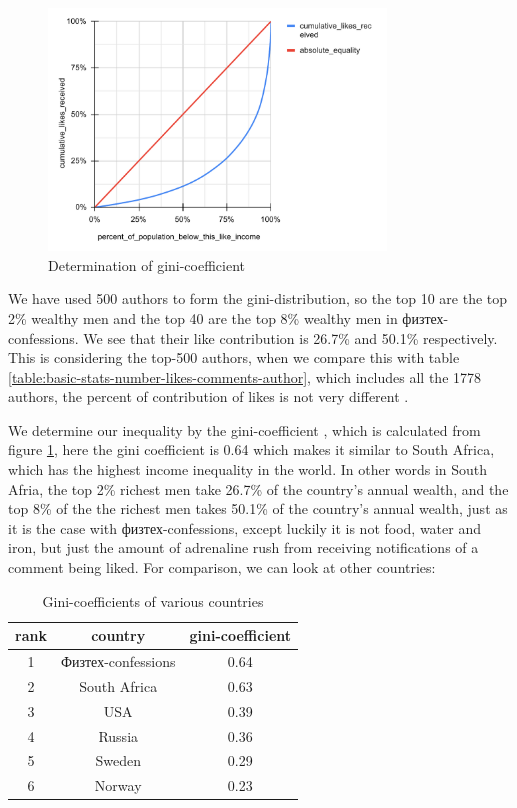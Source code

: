 \documentclass[
	12pt
] {article}
\begin{document}
	\begin{figure}[H]
		\centering
		\includegraphics[width=0.8\textwidth]{fig-gini-calculation}
		\caption{Determination of gini-coefficient \cite{wikipedia-gini}}
		\label{fig-gini-calculation}
	\end{figure}

	We have used 500 authors to form the gini-distribution, so the top 10 are the top \num{2}\% wealthy men and the top 40 are the top \num{8}\% wealthy men in физтех-confessions. We see that their like contribution is \num{26.7}\% and \num{50.1}\% respectively. This is considering the top-500 authors, when we compare this with table \ref{table:basic-stats-number-likes-comments-author}, which includes all the \num{1778} authors, the percent of contribution of likes is not very different \cite{sheet-calc-gini-coefficient}.

	We determine our inequality by the gini-coefficient \cite{wikipedia-gini}, which is calculated from figure \ref{fig-gini-calculation}, here the gini coefficient is \num{0.64} which makes it similar to South Africa, which has the highest income inequality in the world. In other words in South Afria, the top \num{2}\% richest men take \num{26.7}\% of the country's annual wealth, and the top \num{8}\% of the the richest men takes \num{50.1}\% of the country's annual wealth, just as it is the case with физтех-confessions, except luckily it is not food, water and iron, but just the amount of adrenaline rush from receiving notifications of a comment being liked. For comparison, we can look at other countries:
	\begin{table}[H]
		\centering
		\caption{Gini-coefficients of various countries}
		\label{table:gini-countries}
		\begin{tabular}{| c | c | c |} %
			\hline
			rank & country & gini-coefficient \\
			\hline
			1 & Физтех-confessions & \num{0.64} \\
			2 & South Africa & \num{0.63} \\
			3 & USA & \num{0.39} \\
			4 & Russia & \num{0.36} \\
			5 & Sweden & \num{0.29} \\
			6 & Norway & \num{0.23} \\
			\hline
		\end{tabular}
	\end{table}
\end{document}
